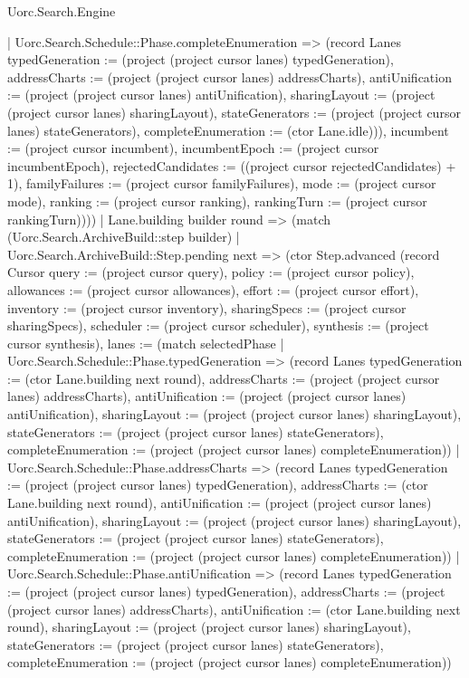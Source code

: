 \begin{lexlean}{Uorc.Search.Engine}
\begin{semanticmodule}
{{        | Uorc.Search.Schedule::Phase.completeEnumeration => (record Lanes {typedGeneration := (project (project cursor lanes) typedGeneration), addressCharts := (project (project cursor lanes) addressCharts), antiUnification := (project (project cursor lanes) antiUnification), sharingLayout := (project (project cursor lanes) sharingLayout), stateGenerators := (project (project cursor lanes) stateGenerators), completeEnumeration := (ctor Lane.idle)})), incumbent := (project cursor incumbent), incumbentEpoch := (project cursor incumbentEpoch), rejectedCandidates := ((project cursor rejectedCandidates) + 1), familyFailures := (project cursor familyFailures), mode := (project cursor mode), ranking := (project cursor ranking), rankingTurn := (project cursor rankingTurn)})))
    | Lane.building builder round => (match (Uorc.Search.ArchiveBuild::step builder)
      | Uorc.Search.ArchiveBuild::Step.pending next => (ctor Step.advanced (record Cursor {query := (project cursor query), policy := (project cursor policy), allowances := (project cursor allowances), effort := (project cursor effort), inventory := (project cursor inventory), sharingSpecs := (project cursor sharingSpecs), scheduler := (project cursor scheduler), synthesis := (project cursor synthesis), lanes := (match selectedPhase
        | Uorc.Search.Schedule::Phase.typedGeneration => (record Lanes {typedGeneration := (ctor Lane.building next round), addressCharts := (project (project cursor lanes) addressCharts), antiUnification := (project (project cursor lanes) antiUnification), sharingLayout := (project (project cursor lanes) sharingLayout), stateGenerators := (project (project cursor lanes) stateGenerators), completeEnumeration := (project (project cursor lanes) completeEnumeration)})
        | Uorc.Search.Schedule::Phase.addressCharts => (record Lanes {typedGeneration := (project (project cursor lanes) typedGeneration), addressCharts := (ctor Lane.building next round), antiUnification := (project (project cursor lanes) antiUnification), sharingLayout := (project (project cursor lanes) sharingLayout), stateGenerators := (project (project cursor lanes) stateGenerators), completeEnumeration := (project (project cursor lanes) completeEnumeration)})
        | Uorc.Search.Schedule::Phase.antiUnification => (record Lanes {typedGeneration := (project (project cursor lanes) typedGeneration), addressCharts := (project (project cursor lanes) addressCharts), antiUnification := (ctor Lane.building next round), sharingLayout := (project (project cursor lanes) sharingLayout), stateGenerators := (project (project cursor lanes) stateGenerators), completeEnumeration := (project (project cursor lanes) completeEnumeration)})
}}
\end{semanticmodule}
\end{lexlean}
